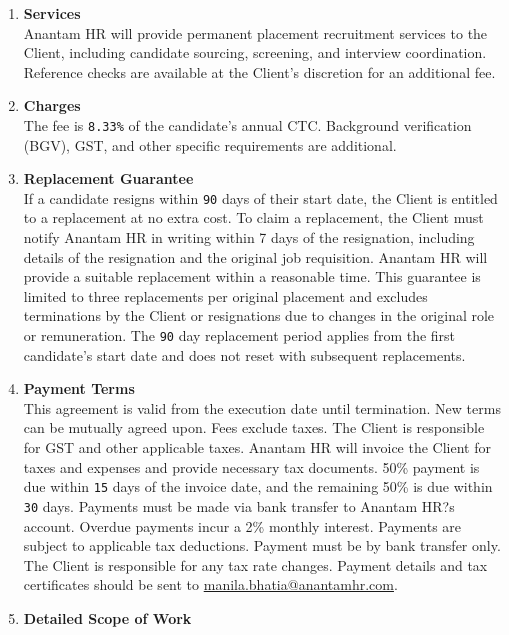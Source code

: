 \documentclass{article}
\begin{document}
\begin{enumerate}[label=\arabic{enumi}.]
    \item \textbf{Services}\\
        Anantam HR will provide permanent placement recruitment services to the Client, including candidate sourcing, screening, and interview coordination. Reference checks are available at the Client's discretion for an additional fee.
    \item \textbf{Charges}\\
        The fee is \texttt{8.33\%} of the candidate's annual CTC. Background verification (BGV), GST, and other specific requirements are additional.
    \item \textbf{Replacement Guarantee}\\
        If a candidate resigns within \texttt{90} days of their start date, the Client is entitled to a replacement at no extra cost. To claim a replacement, the Client must notify Anantam HR in writing within 7 days of the resignation, including details of the resignation and the original job requisition. Anantam HR will provide a suitable replacement within a reasonable time. This guarantee is limited to three replacements per original placement and excludes terminations by the Client or resignations due to changes in the original role or remuneration. The \texttt{90} day replacement period applies from the first candidate's start date and does not reset with subsequent replacements.
    \item \textbf{Payment Terms}\\
        This agreement is valid from the execution date until termination. New terms can be mutually agreed upon. Fees exclude taxes. The Client is responsible for GST and other applicable taxes. Anantam HR will invoice the Client for taxes and expenses and provide necessary tax documents. 50\% payment is due within \texttt{15} days of the invoice date, and the remaining 50\% is due within \texttt{30} days. Payments must be made via bank transfer to Anantam HR?s account. Overdue payments incur a 2\% monthly interest. Payments are subject to applicable tax deductions. Payment must be by bank transfer only. The Client is responsible for any tax rate changes. Payment details and tax certificates should be sent to \href{mailto:[manila.bhatia@anantamhr.com]}{manila.bhatia@anantamhr.com}.
    \item \textbf{Detailed Scope of Work}\\

\end{enumerate}
\end{document}
